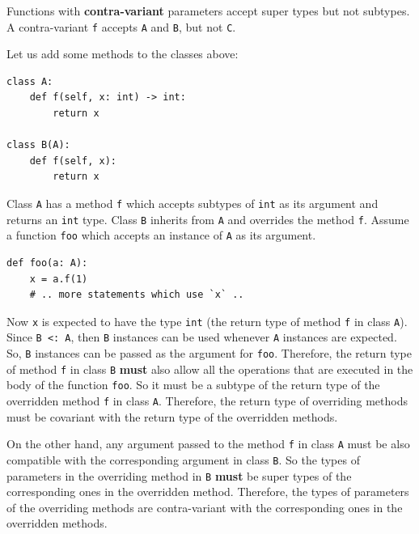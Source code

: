 Functions with \textbf{contra-variant} parameters accept super types but not subtypes. A contra-variant \lstinline|f| accepts \lstinline|A| and \lstinline|B|, but not \lstinline|C|.

Let us add some methods to the classes above:

\begin{lstlisting}
class A:
	def f(self, x: int) -> int:
		return x
		
class B(A):
	def f(self, x):
		return x
\end{lstlisting}
Class \lstinline|A| has a method \lstinline|f| which accepts subtypes of \lstinline|int| as its argument and returns an \lstinline|int| type. Class \lstinline|B| inherits from \lstinline|A| and overrides the method \lstinline|f|. Assume a function \lstinline|foo| which accepts an instance of \lstinline|A| as its argument.

\begin{lstlisting}
def foo(a: A):
	x = a.f(1)
	# .. more statements which use `x` ..
\end{lstlisting}
Now \lstinline|x| is expected to have the type \lstinline|int| (the return type of method \lstinline|f| in class \lstinline|A|). Since \lstinline|B <: A|, then \lstinline|B| instances can be used whenever \lstinline|A| instances are expected. So, \lstinline|B| instances can be passed as the argument for \lstinline|foo|. Therefore, the return type of method \lstinline|f| in class \lstinline|B| \textbf{must} also allow all the operations that are executed in the body of the function \lstinline|foo|. So it must be a subtype of the return type of the overridden method \lstinline|f| in class \lstinline|A|. Therefore, the return type of overriding methods must be covariant with the return type of the overridden methods.

On the other hand, any argument passed to the method \lstinline|f| in class \lstinline|A| must be also compatible with the corresponding argument in class \lstinline|B|. So the types of parameters in the overriding method in \lstinline|B| \textbf{must} be super types of the corresponding ones in the overridden method. Therefore, the types of parameters of the overriding methods are contra-variant with the corresponding ones in the overridden methods. \\

